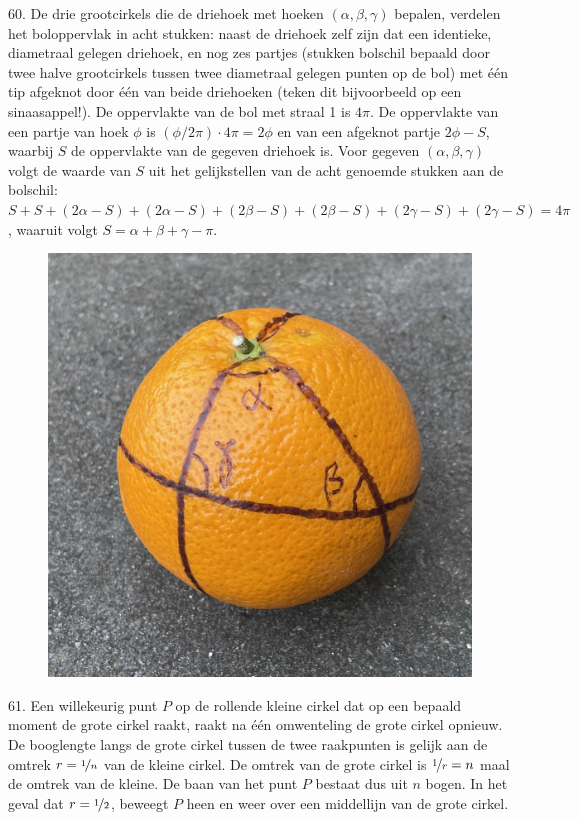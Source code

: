 \clearpage

\begin{problem}{60.}
	De drie grootcirkels die de driehoek met hoeken $(\alpha,\beta,\gamma)$ bepalen, verdelen het boloppervlak in acht stukken: naast de driehoek zelf zijn dat een identieke, diametraal gelegen driehoek, en nog zes partjes (stukken bolschil bepaald door twee halve grootcirkels tussen twee diametraal gelegen punten op de bol) met één tip afgeknot door één van beide driehoeken (teken dit bijvoorbeeld op een sinaasappel!). De oppervlakte van de bol met straal 1 is $4 \pi$. De oppervlakte van een partje van hoek $\phi$ is $(\phi / 2 \pi) \cdot 4 \pi = 2 \phi$ en van een afgeknot partje $2 \phi - S$, waarbij $S$ de oppervlakte van de gegeven driehoek is. Voor gegeven $(\alpha,\beta,\gamma)$ volgt de waarde van $S$ uit het gelijkstellen van de acht genoemde stukken aan de bolschil: $S + S + (2 \alpha - S) + (2 \alpha - S) + (2 \beta - S) + (2 \beta - S) + (2 \gamma - S) + (2 \gamma - S) = 4 \pi$, waaruit volgt $S = \alpha + \beta + \gamma - \pi$.
    \begin{figure}
		\includegraphics[scale=0.3]{resources/oplossing60}
	\end{figure}
\end{problem}

\begin{problem}{61.}
    Een willekeurig punt $P$ op de rollende kleine cirkel dat op een bepaald moment de grote cirkel raakt, raakt na één omwenteling de grote cirkel opnieuw. De booglengte langs de grote cirkel tussen de twee raakpunten is gelijk aan de omtrek $r = \nicefrac{1}{n}$ van de kleine cirkel. De omtrek van de grote cirkel is $\nicefrac{1}{r} = n$ maal de omtrek van de kleine. De baan van het punt $P$ bestaat dus uit $n$ bogen. In het geval dat $r = \nicefrac{1}{2}$, beweegt $P$ heen en weer over een middellijn van de grote cirkel.
\end{problem}

